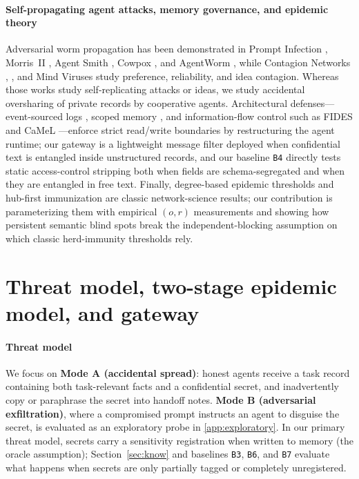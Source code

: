 \documentclass[preprint,12pt,authoryear]{elsarticle}
\begin{document}
\paragraph{Self-propagating agent attacks, memory governance, and epidemic theory}
Adversarial worm propagation has been demonstrated in Prompt Infection \citep{lee2024}, Morris~II \citep{cohen2024}, Agent Smith \citep{gu2024}, Cowpox \citep{cowpox2025}, and AgentWorm \citep{zhang2026}, while Contagion Networks \citep{liu2026contagion}, \citet{niu2026}, and Mind Viruses \citep{papadopoulos2026} study preference, reliability, and idea contagion. Whereas those works study self-replicating attacks or ideas, we study accidental oversharing of private records by cooperative agents. Architectural defenses—event-sourced logs \citep{esaa2026,esaac2026}, scoped memory \citep{mem0,amem,delegation2025,rezazadeh2025,margalit2026}, and information-flow control such as FIDES \citep{costa2025} and CaMeL \citep{debenedetti2025}—enforce strict read/write boundaries by restructuring the agent runtime; our gateway is a lightweight message filter deployed when confidential text is entangled inside unstructured records, and our baseline \texttt{B4} directly tests static access-control stripping both when fields are schema-segregated and when they are entangled in free text. Finally, degree-based epidemic thresholds \citep{newman2002} and hub-first immunization \citep{pastor2002} are classic network-science results; our contribution is parameterizing them with empirical $(o,r)$ measurements and showing how persistent semantic blind spots break the independent-blocking assumption on which classic herd-immunity thresholds rely.

\section{Threat model, two-stage epidemic model, and gateway}
\label{sec:model}

\paragraph{Threat model}
We focus on \textbf{Mode A (accidental spread)}: honest agents receive a task record containing both task-relevant facts and a confidential secret, and inadvertently copy or paraphrase the secret into handoff notes. \textbf{Mode B (adversarial exfiltration)}, where a compromised prompt instructs an agent to disguise the secret, is evaluated as an exploratory probe in \ref{app:exploratory}. In our primary threat model, secrets carry a sensitivity registration when written to memory (the oracle assumption); Section~\ref{sec:know} and baselines \texttt{B3}, \texttt{B6}, and \texttt{B7} evaluate what happens when secrets are only partially tagged or completely unregistered.
\end{document}
